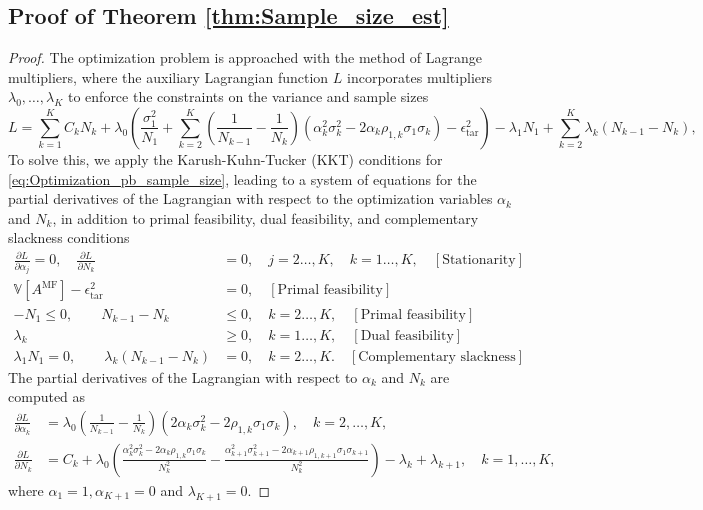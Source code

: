 \subsection{Proof of Theorem \ref{thm:Sample_size_est}}

\begin{proof}
The optimization problem is approached with the method of Lagrange multipliers, where the auxiliary Lagrangian function $L$ incorporates multipliers $\lambda_0,\ldots, \lambda_K$ to enforce the constraints on the variance and sample sizes
%
\[
L = \sum_{k=1}^K C_kN_k +\lambda_0 \left(\frac{\sigma_1^2}{N_1} + \sum_{k=2}^K \left(\frac{1}{N_{k-1}} - \frac{1}{N_k}\right)\left(\alpha_k^2\sigma_k^2 - 2\alpha_k\rho_{1,k}\sigma_1\sigma_k\right)- \epsilon_{\text{tar}}^2\right)-\lambda_1 N_1+\sum_{k=2}^K\lambda_k(N_{k-1} - N_k),
\]
%
To solve this, we apply the Karush-Kuhn-Tucker (KKT) conditions for \eqref{eq:Optimization_pb_sample_size}, leading to a system of equations for the partial derivatives of the Lagrangian with respect to the optimization variables $\alpha_k$ and $N_k$,  in addition to  primal feasibility, dual feasibility, and complementary slackness conditions
%
\begin{align*}
\frac{\partial L}{\partial \alpha_j}=0,\quad \frac{\partial L}{\partial N_k}&=0,\quad j=2\ldots,K, \quad k=1\ldots,K, \quad [\text{Stationarity}]\\
\mathbb{V}\left[A^{\text{MF}}\right]- \epsilon_{\text{tar}}^2 &= 0, \quad [\text{Primal feasibility}]\\ 
   -N_1\le 0,\qquad N_{k-1}-N_k&\le 0, \quad k=2\ldots,K,\quad [\text{Primal feasibility}]\\ 
    \lambda_k &\ge 0,\quad k=1\ldots,K, \quad [\text{Dual feasibility}]\\ 
    \lambda_1 N_1=0,\qquad\lambda_k(N_{k-1}-N_k)&=0,\quad k=2\ldots,K. \quad [\text{Complementary slackness}]
\end{align*}
%
The partial derivatives of the Lagrangian with respect to $\alpha_k$ and $N_k$ are computed as
%
\begin{align}
\label{eq:partial_L_alpha_k}
    \frac{\partial L}{\partial \alpha_k}&=\lambda_0\left(\frac{1}{N_{k-1}} - \frac{1}{N_k}\right)\left(2\alpha_k\sigma_k^2 - 2\rho_{1,k}\sigma_1\sigma_k\right),\quad k=2,\dots,K,\\
    \label{eq:partial_L_N_k}
    \frac{\partial L}{\partial N_k}&=C_k+\lambda_0\left(\frac{\alpha_k^2\sigma_k^2 - 2\alpha_k\rho_{1,k}\sigma_1\sigma_k}{N_k^2}-\frac{\alpha_{k+1}^2\sigma_{k+1}^2 - 2\alpha_{k+1}\rho_{1,k+1}\sigma_1\sigma_{k+1}}{N_k^2}\right)-\lambda_k+\lambda_{k+1}, \quad k=1,\dots,K,
\end{align}
%
where $\alpha_1 = 1, \alpha_{K+1} = 0$ and $\lambda_{K+1} = 0$. 


\end{proof}
